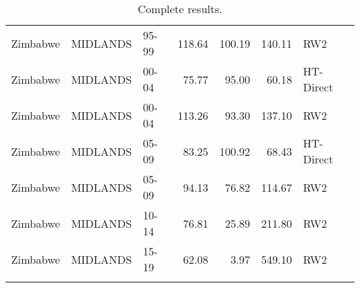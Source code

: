 \begin{longtable}{lllrrrl}
  Zimbabwe & MIDLANDS & 95-99 & 118.64 & 100.19 & 140.11 & RW2 \\ 
  Zimbabwe & MIDLANDS & 00-04 & 75.77 & 95.00 & 60.18 & HT-Direct \\ 
  Zimbabwe & MIDLANDS & 00-04 & 113.26 & 93.30 & 137.10 & RW2 \\ 
  Zimbabwe & MIDLANDS & 05-09 & 83.25 & 100.92 & 68.43 & HT-Direct \\ 
  Zimbabwe & MIDLANDS & 05-09 & 94.13 & 76.82 & 114.67 & RW2 \\ 
  Zimbabwe & MIDLANDS & 10-14 & 76.81 & 25.89 & 211.80 & RW2 \\ 
  Zimbabwe & MIDLANDS & 15-19 & 62.08 & 3.97 & 549.10 & RW2 \\ 
  \hline
\caption{Complete results.} 
\label{fulltable}
\end{longtable}
